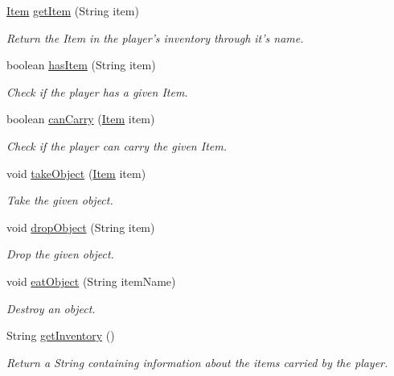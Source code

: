 \begin{DoxyCompactItemize}
\hyperlink{classpkg__world_1_1pkg__items_1_1Item}{Item} \hyperlink{classpkg__world_1_1Player_a913aab92cf289f5278e6e995e7a4d118}{get\-Item} (String item)
\begin{DoxyCompactList}\small\item\em Return the Item in the player's inventory through it's name. \end{DoxyCompactList}\item 
boolean \hyperlink{classpkg__world_1_1Player_a23b53a36fdac45868ee1ea6dcdeca7ce}{has\-Item} (String item)
\begin{DoxyCompactList}\small\item\em Check if the player has a given Item. \end{DoxyCompactList}\item 
boolean \hyperlink{classpkg__world_1_1Player_acca13cc67931809c8067aaca1b8c8459}{can\-Carry} (\hyperlink{classpkg__world_1_1pkg__items_1_1Item}{Item} item)
\begin{DoxyCompactList}\small\item\em Check if the player can carry the given Item. \end{DoxyCompactList}\item 
void \hyperlink{classpkg__world_1_1Player_ac5bdaa8f2149e480e57398be03efa96f}{take\-Object} (\hyperlink{classpkg__world_1_1pkg__items_1_1Item}{Item} item)
\begin{DoxyCompactList}\small\item\em Take the given object. \end{DoxyCompactList}\item 
void \hyperlink{classpkg__world_1_1Player_a202b660b747a977911af058554888387}{drop\-Object} (String item)
\begin{DoxyCompactList}\small\item\em Drop the given object. \end{DoxyCompactList}\item 
void \hyperlink{classpkg__world_1_1Player_ab18847eb6503ad2ac400cc7cd5a7c9a0}{eat\-Object} (String item\-Name)
\begin{DoxyCompactList}\small\item\em Destroy an object. \end{DoxyCompactList}\item 
String \hyperlink{classpkg__world_1_1Player_a2a6e491f41e159bbac42022e55df2d52}{get\-Inventory} ()
\begin{DoxyCompactList}\small\item\em Return a String containing information about the items carried by the player. \end{DoxyCompactList}\item 

\end{DoxyCompactItemize}
